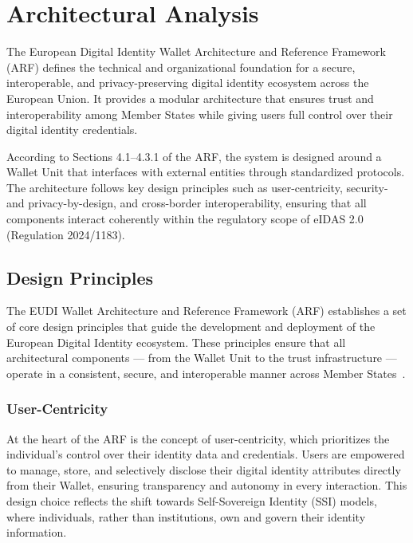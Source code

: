 \documentclass[sigconf,balance,nonacm,authordraft]{acmart}
\begin{document}
\section{Architectural Analysis}
\label{sec:ArchitecturalAnalysis}
The European Digital Identity Wallet Architecture and Reference Framework (ARF) defines the technical and organizational foundation for a secure, interoperable, and privacy-preserving digital identity ecosystem across the European Union.
It provides a modular architecture that ensures trust and interoperability among Member States while giving users full control over their digital identity credentials.

According to Sections 4.1–4.3.1 of the ARF, the system is designed around a Wallet Unit that interfaces with external entities through standardized protocols.
The architecture follows key design principles such as user-centricity, security- and privacy-by-design, and cross-border interoperability, ensuring that all components interact coherently within the regulatory scope of eIDAS 2.0 (Regulation 2024/1183).


\subsection{Design Principles}

The EUDI Wallet Architecture and Reference Framework (ARF) establishes a set of core design principles that guide the development and deployment of the European Digital Identity ecosystem. These principles ensure that all architectural components — from the Wallet Unit to the trust infrastructure — operate in a consistent, secure, and interoperable manner across Member States~\cite{EU_ARF2024}.

\subsubsection*{User-Centricity}
At the heart of the ARF is the concept of user-centricity, which prioritizes the individual's control over their identity data and credentials. Users are empowered to manage, store, and selectively disclose their digital identity attributes directly from their Wallet, ensuring transparency and autonomy in every interaction. This design choice reflects the shift towards Self-Sovereign Identity (SSI) models, where individuals, rather than institutions, own and govern their identity information.
\end{document}
